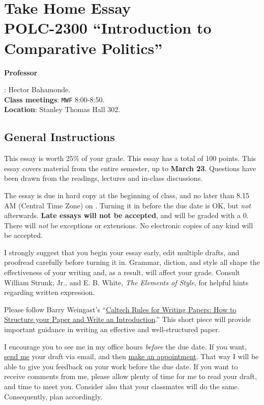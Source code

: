 \documentclass{article}
\begin{document}
\setlength{\parindent}{0em}
\setlength{\parskip}{0.5em}
 
{\centering\section*{{\bf Take Home Essay}\\{\bf POLC-2300 ``Introduction to Comparative Politics''}}}


{\vspace{.5cm}\raggedright \bf Professor}: Hector Bahamonde.\\
{\bf Class meetings}: \texttt{MWF} 8:00-8:50.\\
{\bf Location}: Stanley Thomas Hall 302.


\subsection*{General Instructions}

This essay is worth 25\% of your grade. This essay has a total of 100 points. This essay covers material from the entire semester, up to {\bf  March 23}. Questions have been drawn from the readings, lectures and in-class discussions. 

{\color{blue}The essay is due in hard copy at the beginning of class, and no later than 8.15 AM (Central Time Zone) on {\bf {\unskip}}}. Turning it in before the due date is OK, but \emph{not} afterwards. {\bf Late essays will not be accepted}, and will be graded with a $0$. There will \emph{not} be exceptions or extensions. No electronic copies of any kind will be accepted.

I strongly suggest that you begin your essay early, edit multiple drafts, and proofread carefully before turning it in. Grammar, diction, and style all shape the effectiveness of your writing and, as a result, will affect your grade. Consult William Strunk, Jr., and E. B. White, \emph{The Elements of Style}, for helpful hints regarding written expression. 

Please follow Barry Weingast's ``\href{https://web.stanford.edu/group/mcnollgast/cgi-bin/wordpress/wp-content/uploads/2013/10/CALTECH.RUL_..pdf}{Caltech Rules for Writing Papers: How to Structure your Paper and Write an Introduction}.'' This short piece will provide important guidance in writing an effective and well-structured paper. 

I encourage you to see me in my office hours \emph{before} the due date. If you want, \href{mailto:\filetext}{send me} your draft via email, and then \href{https://calendly.com/bahamonde/officehours}{make an appointment}. That way I will be able to give you feedback on your work before the due date. If you want to receive comments from me, please allow plenty of time for me to read your draft, and time to meet you. Consider also that your classmates will do the same. Consequently, plan accordingly.
\end{document}
